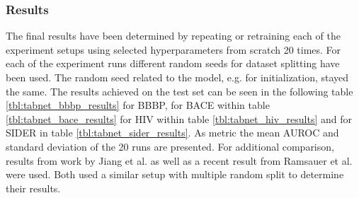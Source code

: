 \documentclass[../main.tex]{subfiles}
\begin{document}
\subsubsection{Results} 

The final results have been determined by repeating or retraining each of the experiment setups using selected hyperparameters from scratch 20 times. For each of the experiment runs different random seeds for dataset splitting have been used. The random seed related to the model, e.g. for initialization, stayed the same. The results achieved on the test set can be seen in the following table \ref{tbl:tabnet_bbbp_results} for BBBP, for BACE within table \ref{tbl:tabnet_bace_results} for HIV within table \ref{tbl:tabnet_hiv_results} and for SIDER in table \ref{tbl:tabnet_sider_results}. As metric the mean AUROC and standard deviation of the 20 runs are presented. For additional comparison, results from work by Jiang et al. \cite{jiang_could_2021} as well as a recent result from Ramsauer et al. \cite{ramsauer_hopfield_2020} were used. Both used a similar setup with multiple random split to determine their results.
\end{document}
